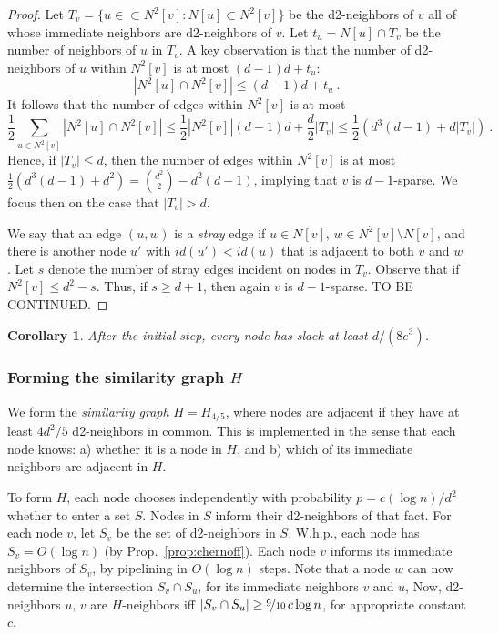 \documentclass[12pt]{article}
\newtheorem{corollary}[theorem]{Corollary}
\newcommand{\myfrac}[2]{\nicefrac{#1}{#2}\,}
\begin{document}
\begin{proof}
Let $T_v = \{u \in \subset N^2[v] : N[u] \subset N^2[v]\}$ be the d2-neighbors of $v$ all of whose immediate neighbors are d2-neighbors of $v$.
Let $t_u = N[u] \cap T_v$ be the number of neighbors of $u$ in $T_v$.
A key observation is that the number of d2-neighbors of $u$ within $N^2[v]$ is at most $(d-1)d + t_u$:
\[ |N^2[u] \cap N^2[v]| \le (d-1)d + t_u\ . \]
It follows that the number of edges within $N^2[v]$ is at most 
\begin{equation}
 \frac{1}{2} \sum_{u \in N^2[v]} |N^2[u] \cap N^2[v]| 
   \le \frac{1}{2} |N^2[v]| (d-1)d + \frac{d}{2} |T_v| 
   \le \frac{1}{2} (d^3 (d-1) + d |T_v|)\ .
\label{eq:internal}
\end{equation}
Hence, if $|T_v| \le d$, then the number of edges within $N^2[v]$ is at most
$\frac{1}{2} (d^3 (d-1) + d^2) = {d^2 \choose 2} - d^2 (d-1)$, implying that $v$ is $d-1$-sparse.
We focus then on the case that $|T_v| > d$.

We say that an edge $(u,w)$ is a \emph{stray} edge if
$u \in N[v]$, $w \in N^2[v]\setminus N[v]$, and there is another node $u'$ with $id(u') < id(u)$ that is adjacent to both $v$ and $w$.
Let $s$ denote the number of stray edges incident on nodes in $T_v$. Observe that if $N^2[v] \le d^2 - s$.
Thus, if $s \ge d+1$, then again $v$ is $d-1$-sparse.
TO BE CONTINUED.
\end{proof}

\begin{corollary}
After the initial step, every node has slack at least $d/(8 e^3)$. 
\label{cor:slack-lb}
\end{corollary}

\subsubsection{Forming the similarity graph $H$} 

We form the \emph{similarity graph} $H = H_{4/5}$, where nodes are adjacent if they have at least $4d^2/5$ d2-neighbors in common.
This is implemented in the sense that each node knows:
a) whether it is a node in $H$, and
b) which of its immediate neighbors are adjacent in $H$.

To form $H$, each node chooses independently with probability $p = c(\log n)/d^2$ whether to enter a set $S$. Nodes in $S$ inform their d2-neighbors of that fact. For each node $v$, let $S_v$ be the set of d2-neighbors in $S$. W.h.p., each node has $S_v = O(\log n)$ (by Prop.~\ref{prop:chernoff}). Each node $v$ informs its immediate neighbors of $S_v$, by pipelining in $O(\log n)$ steps.
Note that a node $w$ can now determine the intersection $S_v \cap S_u$, for its immediate neighbors $v$ and $u$,
Now, d2-neighbors $u$, $v$ are $H$-neighbors iff $|S_v \cap S_u| \ge \myfrac{9}{10} c \log n$, for appropriate constant $c$. 
\end{document}
